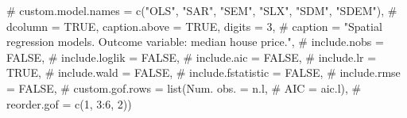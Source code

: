 \documentclass[
  letterpaper,
]{scrbook}
\newenvironment{Shaded}{\begin{snugshade}}{\end{snugshade}}
\newcommand{\CommentTok}[1]{\textcolor[rgb]{0.37,0.37,0.37}{#1}}
\begin{document}
\begin{Shaded}
\begin{Highlighting}[]
\CommentTok{\#           custom.model.names = c("OLS", "SAR", "SEM", "SLX", "SDM", "SDEM"),}
\CommentTok{\#           dcolumn = TRUE, caption.above = TRUE, digits = 3,}
\CommentTok{\#           caption = "Spatial regression models. Outcome variable: median house price.",}
\CommentTok{\#           include.nobs = FALSE,}
\CommentTok{\#   include.loglik = FALSE,}
\CommentTok{\#   include.aic = FALSE,}
\CommentTok{\#   include.lr = TRUE,}
\CommentTok{\#   include.wald = FALSE,}
\CommentTok{\#   include.fstatistic = FALSE,}
\CommentTok{\#   include.rmse = FALSE,}
\CommentTok{\#   custom.gof.rows = list(\textquotesingle{}Num. obs.\textquotesingle{} = n.l, }
\CommentTok{\#                          \textquotesingle{}AIC\textquotesingle{} = aic.l), }
\CommentTok{\#   reorder.gof = c(1, 3:6, 2))}
\end{Highlighting}
\end{Shaded}
\end{document}
